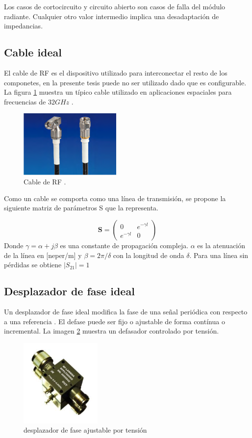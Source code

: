 Los casos de cortocircuito y circuito abierto son casos de falla del módulo radiante. Cualquier otro valor intermedio implica
una desadaptación de impedancias.

\subsection{Cable ideal}
El cable de RF es el dispositivo utilizado para interconectar el resto de los componetes, en la presente tesis puede no ser 
utilizado dado que es configurable. La figura \ref{fig:cableRF} muestra un típico cable utilizado en aplicaciones espaciales 
para frecuencias de $32GHz$ \cite{Gore2013}.

\begin{figure}[H]
 \centering
 \includegraphics[width=5cm]{gfx/cableRF.png}
 \caption{Cable de RF \cite{Gore2013}.}
 \label{fig:cableRF}
\end{figure}

Como un cable se comporta como una línea de transmisión, se propone la siguiente matriz de parámetros S que la 
representa.

$$
\mathbf{S} = \begin{pmatrix} 0 & e^{-\gamma l}\\e^{-\gamma l} & 0\end{pmatrix}
$$
Donde $\gamma = \alpha + j\beta$ es una constante de propagación compleja. $\alpha$ es la atenuación de la línea en [neper/m]
y $\beta = 2\pi/\delta$ con la longitud de onda $\delta$. Para una línea sin pérdidas se obtiene $|S_{21}| = 1$

\subsection{Desplazador de fase ideal}

Un desplazador de fase ideal modifica la fase de una señal periódica con respecto a una referencia \cite{Standard1996}. El 
defase puede ser fijo o ajustable de forma contínua o incremental. La imagen \ref{fig:phaseShifter} muestra un defasador 
controlado por tensión.

\begin{figure}[H]
 \centering
 \includegraphics[width=4cm]{gfx/phaseShifter.png}
 \caption{desplazador de fase ajustable por tensión \cite{Shifter}}
 \label{fig:phaseShifter}
\end{figure}

